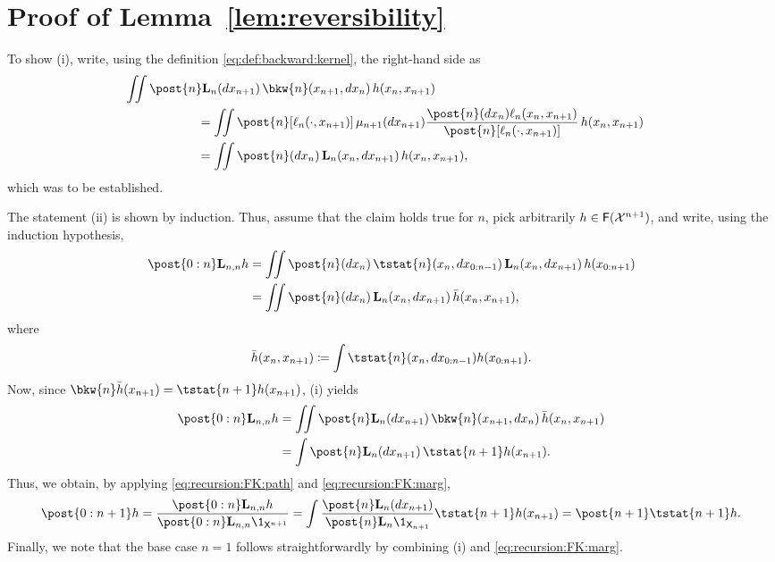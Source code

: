 \section{Proof of Lemma~\ref{lem:reversibility}}
\label{sec:proof:lem:reversibility}

To show (i), write, using the definition \eqref{eq:def:backward:kernel}, the right-hand side as 
\begin{align*}
\lefteqn{\iint \post{n} \uk{n}(\rmd x_{n + 1}) \, \bkw{n}(x_{n + 1}, \rmd x_n) \, h(x_n, x_{n + 1})} \hspace{20mm} \\
&= \iint \post{n}[\ud{n}(\cdot, x_{n + 1})] \, \mu_{n + 1}(\rmd x_{n + 1}) \frac{\post{n}(\rmd x_n) \ud{n}(x_n, x_{n + 1})}{\post{n}[\ud{n}(\cdot, x_{n + 1})]} \, h(x_n, x_{n + 1}) \\
&= \iint \post{n}(\rmd x_n) \, \uk{n}(x_n, \rmd x_{n + 1}) \, h(x_n, x_{n + 1}), 
\end{align*}
which was to be established. 

The statement (ii) is shown by induction. Thus, assume that the claim holds true for $n$, pick arbitrarily $h \in \mathsf{F}(\mathcal{X}^{n + 1})$, and write, using the induction hypothesis, 
\begin{align*}
\post{0:n} \uk{n, n} h &= \iint \post{n}(\rmd x_n) \, \tstat{n}(x_n, \rmd x_{0:n - 1}) \, \uk{n}(x_n, \rmd x_{n + 1}) \, h(x_{0:n + 1}) \\
&= \iint \post{n}(\rmd x_n) \, \uk{n}(x_n, \rmd x_{n + 1}) \, \bar{h}(x_n, x_{n + 1}), 
\end{align*}
where 
$$
\bar{h}(x_n, x_{n + 1}) \eqdef \int \tstat{n}(x_n, \rmd x_{0:n - 1}) h(x_{0:n + 1}). 
$$
Now, since $\bkw{n} \bar{h}(x_{n + 1}) = \tstat{n + 1} h(x_{n + 1})$, (i) yields
\begin{align*} 
\post{0:n} \uk{n, n} h 
&= \iint \post{n} \uk{n}(\rmd x_{n + 1}) \, \bkw{n}(x_{n + 1}, \rmd x_n) \, \bar{h}(x_n, x_{n + 1}) \\
&= \int \post{n} \uk{n}(\rmd x_{n + 1}) \, \tstat{n + 1} h(x_{n + 1}). 
\end{align*}
Thus, we obtain, by applying \eqref{eq:recursion:FK:path} and \eqref{eq:recursion:FK:marg},  
$$
\post{0:n + 1} h = \frac{\post{0:n} \uk{n, n} h}{\post{0:n} \uk{n, n} \1_{\Xset^{n+1}}} 
= \int \frac{\post{n} \uk{n}(\rmd x_{n + 1})}{\post{n} \uk{n} \1_{\Xset_{n + 1}}} \tstat{n + 1} h(x_{n + 1}) = \post{n + 1} \tstat{n + 1} h. 
$$
Finally, we note that the base case $n = 1$ follows straightforwardly by combining (i) and \eqref{eq:recursion:FK:marg}. 

